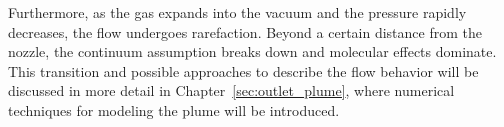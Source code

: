 		Furthermore, as the gas expands into the vacuum and the pressure rapidly decreases, the flow undergoes rarefaction.
		Beyond a certain distance from the nozzle, the continuum assumption breaks down and molecular effects dominate.
		This transition and possible approaches to describe the flow behavior will be discussed in more detail in Chapter~\ref{sec:outlet_plume}, where numerical techniques for modeling the plume will be introduced.
		\cite{anderson2021modern}
